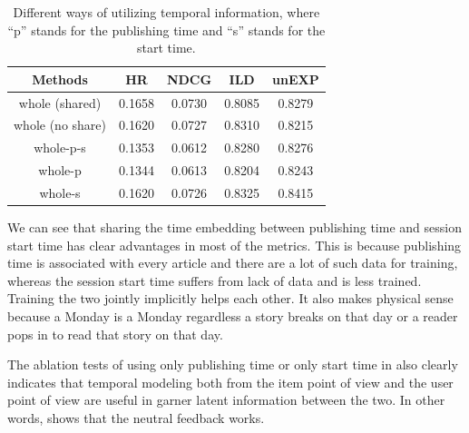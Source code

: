 \begin{table}[th]
  \caption{Different ways of utilizing temporal information, where ``p'' stands for the publishing time and ``s'' stands for the start time. }
  \label{tb:temporal}
  \centering
  \renewcommand{\arraystretch}{1.3}
  \begin{tabular}{|c|cccc|}
    \hline
    Methods  & HR & NDCG & ILD & unEXP \\
    \hline
    whole (shared) & 0.1658 & 0.0730 & 0.8085 & 0.8279\\
    whole (no share) & 0.1620 & 0.0727 & 0.8310 & 0.8215\\
    \hline
    whole-p-s & 0.1353 & 0.0612 & 0.8280 & 0.8276\\
    whole-p & 0.1344 & 0.0613 & 0.8204 & 0.8243\\
    whole-s & 0.1620 & 0.0726 & 0.8325 & 0.8415\\
    \hline
  \end{tabular}
\end{table}

We can see that sharing the time embedding between publishing time and
session start time has clear advantages in most of the metrics. This is
because publishing time is associated with every article and there are a lot of
such data for training, whereas the session start time suffers from lack
of data and is less trained. Training the two jointly implicitly helps each 
other. It also makes physical sense because a Monday is a Monday regardless
a story breaks on that day or a reader pops in to read that story on that day.

The ablation tests of using only publishing time or only start time in
 also clearly indicates that temporal modeling both from
the item point of view and the user point of view are useful in garner latent
information between the two. In other words,  shows that
the neutral feedback works.


